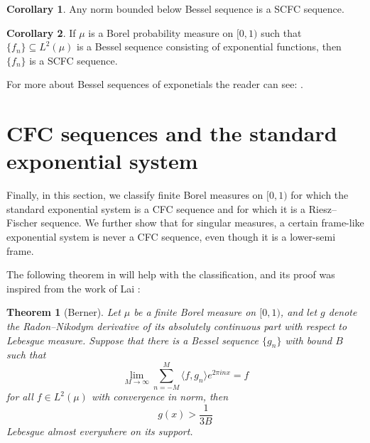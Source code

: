 \documentclass[11pt]{amsart}
\newtheorem*{thm*}{Theorem}
\theoremstyle{definition}
\newtheorem{cor}{Corollary}[section]
\numberwithin{equation}{section}
\begin{document}
\begin{cor}
Any norm bounded below Bessel sequence is a SCFC sequence.
\end{cor}

\begin{cor}
If $\mu$ is a Borel probability measure on $[0,1)$ such that $\{f_n\}\subseteq L^{2}(\mu)$ is a Bessel sequence consisting of exponential functions, then $\{f_n\}$ is a SCFC sequence.
\end{cor}

For more about Bessel sequences of exponetials the reader can see: \cite{Dutkay2011Bessel,He2013Exponential, Nir2018Fourier}.

\section{CFC sequences and the standard exponential system}\label{7}
Finally, in this section, we classify finite Borel measures on $[0,1)$ for which the standard exponential system is a CFC sequence and for which it is a Riesz–Fischer sequence. We further show that for singular measures, a certain frame-like exponential system is never a CFC sequence, even though it is a lower-semi frame.

The following theorem in \cite{Berner2024Frame-like} will help with the classification, and its proof was inspired from the work of Lai \cite{Lai2011Fourier}:
\begin{thm*}[Berner]
Let $\mu$ be a finite Borel measure on $[0,1)$, and let $g$ denote the Radon–Nikodym derivative of its absolutely continuous part with respect to Lebesgue measure. Suppose that there is a Bessel sequence $\{g_{n}\}$ with bound $B$ such that
$$\lim_{M\to \infty}\sum_{n=-M}^{M}\langle f, g_{n}\rangle e^{2\pi i nx}=f$$
for all $f\in L^{2}(\mu)$ with convergence in norm, then $$g(x)>\frac{1}{3B}$$ Lebesgue almost everywhere on its support.
\end{thm*}
\end{document}
